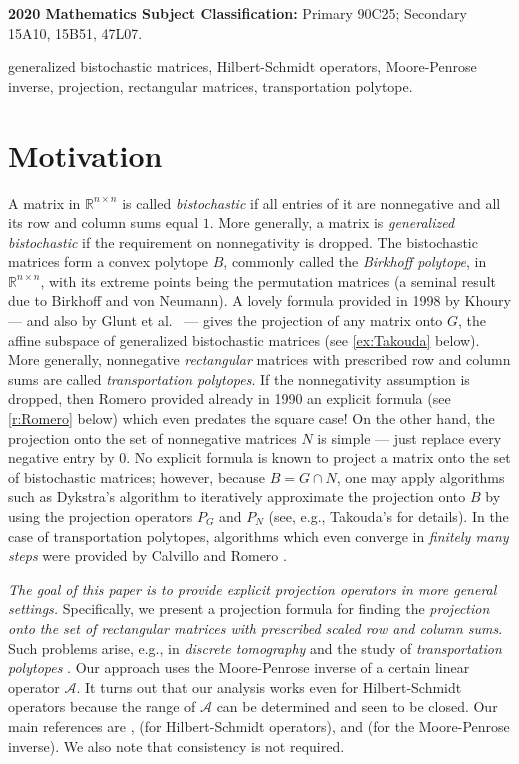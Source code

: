 \documentclass[12pt]{article}
\newcommand{\RR}{\ensuremath{\mathbb R}}
\theoremstyle{definition}
\providecommand{\RR}{\mathbb{R}}
\providecommand{\RR}{\mathbb{R}}
\providecommand{\mA}{\mathcal{A}}
\begin{document}
{%
\noindent
{\bfseries 2020 Mathematics Subject Classification:}
{Primary 
90C25;
Secondary 
15A10, %
15B51, %
47L07.%
}

generalized bistochastic matrices,
Hilbert-Schmidt operators, 
Moore-Penrose inverse, 
projection,
rectangular matrices, 
{  transportation polytope}. 

\section{Motivation}

A matrix in $\RR^{n\times n}$ is called \emph{bistochastic} if  all entries of it are nonnegative and all its row and column sums equal $1$. 
More generally, a matrix is \emph{generalized bistochastic} 
if the requirement on nonnegativity is dropped. 
The bistochastic matrices form a convex polytope $B$, 
commonly called the \emph{Birkhoff polytope}, 
in $\RR^{n\times n}$, with its extreme points being 
the permutation matrices (a seminal result due to 
Birkhoff and von Neumann). 
A lovely formula provided in 1998 by Khoury \cite{Khoury} 
--- and also by Glunt et al.~\cite{Gluntetal1} --- 
gives 
the projection { of} any matrix onto $G$, the affine subspace of 
generalized bistochastic matrices 
(see \cref{ex:Takouda} below). 
{ 
More generally, nonnegative \emph{rectangular} matrices with prescribed
row and column sums are called \emph{transportation polytopes}. 
If the nonnegativity assumption is dropped, then 
Romero provided already in 1990 an explicit formula 
(see \cref{r:Romero} below) which even predates the square case!
}
On the other hand, 
the projection onto the set of nonnegative matrices $N$ is simple --- just replace every negative entry by $0$. 
No explicit formula is known to project a matrix onto the set 
of bistochastic matrices; however, because $B=G\cap N$,
one may apply algorithms such as Dykstra's algorithm to iteratively approximate the projection onto $B$ by using 
the projection operators $P_G$ and $P_N$ (see, 
e.g., Takouda's \cite{Takouda05} for details). 
{ 
In the case of transportation polytopes, algorithms
which even converge in \emph{finitely many steps}
were provided by Calvillo and Romero \cite{CaRo}.
}

{\it The goal of this paper is to provide explicit projection 
operators in more general settings.} Specifically, we present 
a projection formula for finding the {\it projection onto 
the set of rectangular matrices
with prescribed \emph{scaled} row and column sums}. 
{  Such problems arise, e.g., in \emph{discrete tomography} \cite{wiki:dt}} {  and the study of \emph{transportation polytopes} \cite{CaRo}.}
Our approach uses
the Moore-Penrose inverse of a certain linear operator $\mA$. 
It turns out
that our analysis works even for Hilbert-Schmidt operators
because the range of $\mA$ can be determined and seen to be 
closed. Our main references are \cite{BC2017}, \cite{KadiRing1} 
{  (for Hilbert-Schmidt operators)}, 
and \cite{Groetsch} {  (for the Moore-Penrose inverse). 
We also note that consistency is not required.}

}
\end{document}
